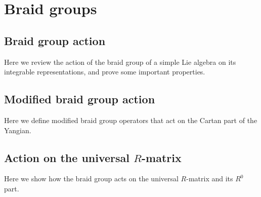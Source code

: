 \chapter{Braid groups}

\section{Braid group action}

Here we review the action of the braid group of a simple Lie algebra on its integrable representations, and prove some important properties.

\section{Modified braid group action}

Here we define modified braid group operators that act on the Cartan part of the Yangian.

\section{Action on the universal \texorpdfstring{$R$}{R}-matrix}

Here we show how the braid group acts on the universal $R$-matrix and its $R^0$ part.
